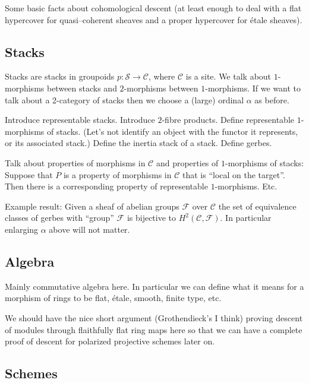 \smallskip\noindent
Some basic facts about cohomological descent (at least enough to deal
with a flat hypercover for quasi--coherent sheaves and a proper
hypercover for \'etale sheaves).

\subsection{Stacks}
\label{stacks}

\noindent
Stacks are stacks in groupoids $p : \mathcal{S} \to \mathcal{C}$, where 
$\mathcal{C}$ is a site. We talk about $1$-morphisms between stacks and 
$2$-morphisms between $1$-morphisms. If we want to talk about a 
2-category of stacks then we choose a (large) ordinal $\alpha$ as before.

\smallskip\noindent
Introduce representable stacks. Introduce $2$-fibre products. Define 
representable $1$-morphisms of stacks. (Let's not identify an object 
with the functor it represents, or its associated stack.) Define the
inertia stack of a stack. Define gerbes.

\smallskip\noindent
Talk about properties of morphisms in $\mathcal{C}$ and properties of
$1$-morphisms of stacks: Suppose that $P$ is a property of morphisms
in $\mathcal{C}$ that is ``local on the target''. Then there is a 
corresponding property of representable $1$-morphisms. Etc.

\smallskip\noindent
Example result: Given a sheaf of abelian groups $\mathcal{F}$ 
over $\mathcal{C}$ the set of equivalence classes of gerbes with ``group'' 
$\mathcal{F}$ is bijective to $H^2(\mathcal{C}, \mathcal{F})$.
In particular enlarging $\alpha$ above will not matter.

\subsection{Algebra}
\label{subsection-algebra}

\noindent
Mainly commutative algebra here. In particular we can define what it means
for a morphism of rings to be flat, \'etale, smooth, finite type, etc.

\smallskip\noindent
We should have the nice short argument (Grothendieck's I think) proving 
descent of modules through flaithfully flat ring maps here so that we can 
have a complete proof of descent for polarized projective schemes later on.

\subsection{Schemes}
\label{subsection-schemes}

